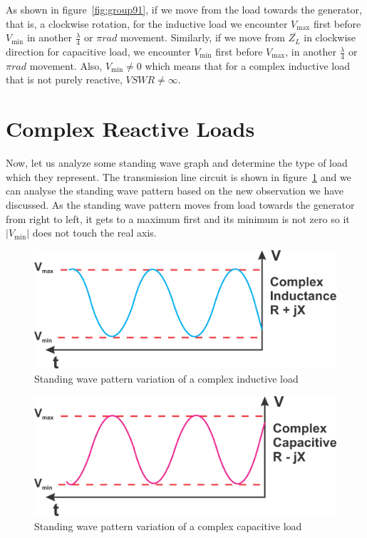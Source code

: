 As shown in figure~\ref{fig:group91}, if we move from the load towards the generator, that is, a clockwise rotation, for the inductive load we encounter $V_\max$ first before ${V_\min}$ in another $\frac{\lambda}{4}$ or $\pi rad$ movement. Similarly, if we move from $\bar{Z_L}$ in clockwise direction for capacitive load, we encounter $V_\min$ first before $V_\max$, in another $\frac{\lambda}{4}$ or $\pi rad$ movement. Also, $V_\min\neq0$ which means that for a complex inductive load that is not purely reactive, $VSWR\neq\infty$.

\section{Complex Reactive Loads}
Now, let us analyze some standing wave graph and determine the type of load which they represent. The transmission line circuit is shown in figure~\ref{fig:group93} and we can analyse the standing wave pattern based on the new observation we have discussed. As the standing wave pattern moves from load towards the generator from right to left, it gets to a maximum first and its minimum is not zero so it $|V_\min|$ does not touch the real axis.
\begin{figure}[h]
\centering
\includegraphics[scale=0.5]{./graphics/Group93}
\caption{Standing wave pattern variation of a complex inductive load}
\label{fig:group93}
\end{figure}
\begin{figure}[h]
\centering
\includegraphics[scale=0.5]{./graphics/Group94}
\caption{Standing wave pattern variation of a complex capacitive load}
\label{fig:group94}
\end{figure}

